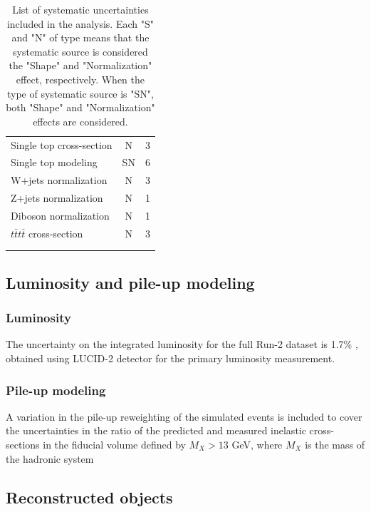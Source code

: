 \begin{longtable}[hp]{lcc}
    \multicolumn{1}{l}{Single top cross-section}         & N  & 3\\
    \multicolumn{1}{l}{Single top modeling}             & SN & 6\\
    \multicolumn{1}{l}{W+jets normalization}             & N  & 3\\
    \multicolumn{1}{l}{Z+jets normalization}             & N  & 1\\
    \multicolumn{1}{l}{Diboson normalization}            & N  & 1\\
    \multicolumn{1}{l}{$t\bar{t}t\bar{t}$ cross-section} & N  & 3\\
    \hline\hline
    \hline

    \caption{List of systematic uncertainties included in the analysis. Each "S" and "N" of type means that the systematic source is considered the "Shape" and "Normalization" effect, respectively. When the type of systematic source is "SN", both "Shape" and "Normalization" effects are considered.}\\
    \label{tab:SystSources}\\
\end{longtable}

\subsection{Luminosity and pile-up modeling}
\label{subsec:SystOfLumiAndPU}

\subsubsection{Luminosity}
\label{subsec:SystOfLumi}
The uncertainty on the integrated luminosity for the full Run-2 dataset is 1.7\% \cite{ATLAS-CONF-2019-021}, obtained using LUCID-2 detector \cite{G.Avoni-2018} for the primary luminosity measurement.

\subsubsection{Pile-up modeling}
\label{subsec:SystOfPileupModelling}
A variation in the pile-up reweighting of the simulated events is included to cover the uncertainties in the ratio of the predicted and measured inelastic cross-sections in the fiducial volume defined by $M_{X}>13$ GeV, where $M_{X}$ is the mass of the hadronic system \cite{STDM-2015-05}

\subsection{Reconstructed objects}
\label{subsec:SystOfRecoObjs}
